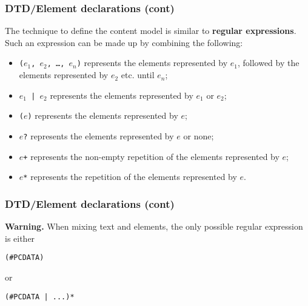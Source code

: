 %
\begin{frame}
\frametitle{DTD/Element declarations (cont)}

The technique to define the content model is similar to
\textbf{regular expressions}. Such an expression can be made up by
combining the following:
\begin{itemize}

  \item \texttt{(\(e_1\), \(e_2\), \dots , \(e_n\))} represents the
    elements represented by \(e_1\), followed by the elements
    represented by \(e_2\) etc. until \(e_n\);

  \item \texttt{\(e_1\) | \(e_2\)} represents the elements represented
    by \(e_1\) or \(e_2\);

  \item \texttt{(\(e\))} represents the elements represented by \(e\);

  \item \texttt{\(e\)?} represents the elements represented by \(e\)
    or none;

  \item \texttt{\(e\)+} represents the non-empty repetition of
    the elements represented by \(e\);

  \item \texttt{\(e\)*} represents the repetition of the elements
    represented by \(e\).

\end{itemize}

\end{frame}

%
\begin{frame}[containsverbatim]
\frametitle{DTD/Element declarations (cont)}

\textbf{Warning.} When mixing text and elements, the only possible
regular expression is either
\begin{verbatim}
(#PCDATA)
\end{verbatim}
or
\begin{verbatim}
(#PCDATA | ...)*
\end{verbatim}

\end{frame}


